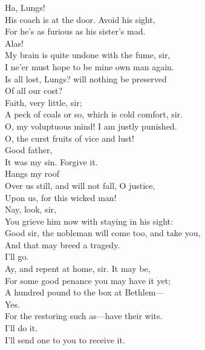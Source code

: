 \documentclass[a4paper,oneside,12pt]{memoir}
\begin{document}
\begin{drama*}
\mammonspeaks {} Ha, Lungs!\\
\facespeaks His coach is at the door. Avoid his sight,\\
For he's as furious as his sister's mad.\\
\mammonspeaks Alas!\\
\facespeaks {} My brain is quite undone with the fume, sir,\\
I ne'er must hope to be mine own man again.\\
\mammonspeaks Is all lost, Lungs? will nothing be preserved\\
Of all our cost?\\
\facespeaks {} Faith, very little, sir;\\
A peck of coals or so, which is cold comfort, sir.\\
\mammonspeaks O, my voluptuous mind! I am justly punished.\\
\subtlespeaks O, the curst fruits of vice and lust!\\
\mammonspeaks {} Good father,\\
It was my sin. Forgive it.\\
\subtlespeaks {} Hangs my roof\\
Over us still, and will not fall, O justice,\\
Upon us, for this wicked man!\\
\facespeaks {} Nay, look, sir,\\
You grieve him now with staying in his sight:\\
Good sir, the nobleman will come too, and take you,\\
And that may breed a tragedy.\\
\mammonspeaks {} I'll go.\\
\facespeaks Ay, and repent at home, sir. It may be,\\
For some good penance you may have it yet;\\
A hundred pound to the box at Bethlem---\\
\mammonspeaks Yes.\\
\facespeaks {} For the restoring such as---have their wits.\\
\mammonspeaks I'll do it.\\
\facespeaks {} I'll send one to you to receive it.\\

\end{drama*}
\end{document}
